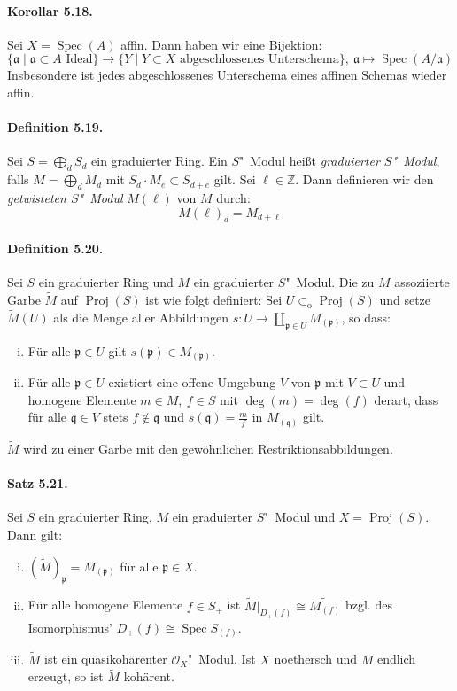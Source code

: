 \documentclass[11pt,b5paper,openany]{memoir}
\begin{document}
\paragraph{Korollar 5.18.}\label{5.18} Sei $X=\operatorname{Spec}(A)$ affin. Dann haben wir eine Bijektion:
\[\{\mathfrak{a}\mid \mathfrak{a}\subset A \text{ Ideal}\}\to \{Y\mid Y\subset X \text{ abgeschlossenes Unterschema}\},\ \mathfrak{a}\mapsto \operatorname{Spec}(A/\mathfrak{a}) \]
Insbesondere ist jedes abgeschlossenes Unterschema eines affinen Schemas wieder affin.

\paragraph{Definition 5.19.}\label{5.19} Sei $S=\bigoplus_d S_d$ ein graduierter Ring. Ein $S$"~Modul heißt \textit{graduierter $S$"~Modul}, falls $M=\bigoplus_d M_d$ mit $S_d\cdot M_e\subset S_{d+e}$ gilt. Sei $\ell\in\mathbb{Z}$. Dann definieren wir den \textit{getwisteten $S$"~Modul} $M(\ell)$ von $M$ durch:
\[M(\ell)_d = M_{d+\ell} \]

\paragraph{Definition 5.20.}\label{5.20} Sei $S$ ein graduierter Ring und $M$ ein graduierter $S$"~Modul. Die zu $M$ assoziierte Garbe $\widetilde{M}$ auf $\operatorname{Proj}(S)$ ist wie folgt definiert: Sei $U\subset_\text{o}\operatorname{Proj}(S)$ und setze $\widetilde{M}(U)$ als die Menge aller Abbildungen $s:U\to\coprod_{\mathfrak{p}\in U}M_{(\mathfrak{p})}$, so dass:
\begin{enumerate}[(i)]
\item Für alle $\mathfrak{p}\in U$ gilt $s(\mathfrak{p})\in M_{(\mathfrak{p})}$.
\item Für alle $\mathfrak{p}\in U$ existiert eine offene Umgebung $V$ von $\mathfrak{p}$ mit $V\subset U$ und homogene Elemente $m\in M,\ f\in S$ mit $\deg(m)=\deg(f)$ derart, dass für alle $\mathfrak{q}\in V$ stets $f\not\in\mathfrak{q}$ und $s(\mathfrak{q})=\frac{m}{f}$ in $M_{(\mathfrak{q})}$ gilt.
\end{enumerate}
$\widetilde{M}$ wird zu einer Garbe mit den gewöhnlichen Restriktionsabbildungen.

\paragraph{Satz 5.21.}\label{5.21} Sei $S$ ein graduierter Ring, $M$ ein graduierter $S$"~Modul und $X=\operatorname{Proj}(S)$. Dann gilt:
\begin{enumerate}[(i)]
\item $(\widetilde{M})_\mathfrak{p}=M_{(\mathfrak{p})}$ für alle $\mathfrak{p}\in X$.
\item Für alle homogene Elemente $f\in S_+$ ist $\widetilde{M}|_{D_+(f)}\cong\widetilde{M_{(f)}}$ bzgl. des Isomorphismus' $D_+(f)\cong\operatorname{Spec}S_{(f)}$.
\item $\widetilde{M}$ ist ein quasikohärenter $\mathcal{O}_X$"~Modul. Ist $X$ noethersch und $M$ endlich erzeugt, so ist $\widetilde{M}$ kohärent.
\end{enumerate}
\end{document}
